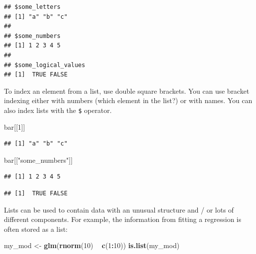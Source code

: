 \documentclass[]{book}
\makeatletter
\newenvironment{Shaded}{\begin{snugshade}}{\end{snugshade}}
\newcommand{\KeywordTok}[1]{\textcolor[rgb]{0.13,0.29,0.53}{\textbf{#1}}}
\newcommand{\DecValTok}[1]{\textcolor[rgb]{0.00,0.00,0.81}{#1}}
\newcommand{\StringTok}[1]{\textcolor[rgb]{0.31,0.60,0.02}{#1}}
\newcommand{\OperatorTok}[1]{\textcolor[rgb]{0.81,0.36,0.00}{\textbf{#1}}}
\newcommand{\NormalTok}[1]{#1}
\newenvironment{kframe}{%
\medskip{}
\setlength{\fboxsep}{.8em}
 \def\at@end@of@kframe{}%
 \ifinner\ifhmode%
  \def\at@end@of@kframe{\end{minipage}}%
  \begin{minipage}{\columnwidth}%
 \fi\fi%
 \def\FrameCommand##1{\hskip\@totalleftmargin \hskip-\fboxsep
 \colorbox{shadecolor}{##1}\hskip-\fboxsep
     \hskip-\linewidth \hskip-\@totalleftmargin \hskip\columnwidth}%
 \MakeFramed {\advance\hsize-\width
   \@totalleftmargin\z@ \linewidth\hsize
   \@setminipage}}%
 {\par\unskip\endMakeFramed%
 \at@end@of@kframe}
\renewenvironment{Shaded}{\begin{kframe}}{\end{kframe}}
\theoremstyle{definition}
\theoremstyle{definition}
\theoremstyle{definition}
\theoremstyle{remark}
\makeatother
\begin{document}
\begin{verbatim}
## $some_letters
## [1] "a" "b" "c"
## 
## $some_numbers
## [1] 1 2 3 4 5
## 
## $some_logical_values
## [1]  TRUE FALSE
\end{verbatim}

To index an element from a list, use double square brackets. You can use
bracket indexing either with numbers (which element in the list?) or
with names. You can also index lists with the \texttt{\$} operator.

\begin{Shaded}
\begin{Highlighting}[]
\NormalTok{bar[[}\DecValTok{1}\NormalTok{]]}
\end{Highlighting}
\end{Shaded}

\begin{verbatim}
## [1] "a" "b" "c"
\end{verbatim}

\begin{Shaded}
\begin{Highlighting}[]
\NormalTok{bar[[}\StringTok{"some_numbers"}\NormalTok{]]}
\end{Highlighting}
\end{Shaded}

\begin{verbatim}
## [1] 1 2 3 4 5
\end{verbatim}

\begin{Shaded}
\end{Shaded}

\begin{verbatim}
## [1]  TRUE FALSE
\end{verbatim}

Lists can be used to contain data with an unusual structure and / or
lots of different components. For example, the information from fitting
a regression is often stored as a list:

\begin{Shaded}
\begin{Highlighting}[]
\NormalTok{my_mod <-}\StringTok{ }\KeywordTok{glm}\NormalTok{(}\KeywordTok{rnorm}\NormalTok{(}\DecValTok{10}\NormalTok{) }\OperatorTok{~}\StringTok{ }\KeywordTok{c}\NormalTok{(}\DecValTok{1}\OperatorTok{:}\DecValTok{10}\NormalTok{))}
\KeywordTok{is.list}\NormalTok{(my_mod)}
\end{Highlighting}
\end{Shaded}
\end{document}
